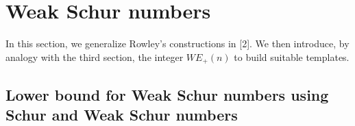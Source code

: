 \documentclass{article}
\newtheorem{computational theorem}{Computational Theorem}[theorem]
\begin{document}
\subsection{}


\section{Weak Schur numbers}

In this section, we generalize Rowley's constructions in [2]. We then introduce, by analogy with the third section, the integer \(WE_+(n)\) 
to build suitable templates.

\subsection{Lower bound for Weak Schur numbers using Schur and Weak Schur numbers}
\end{document}
